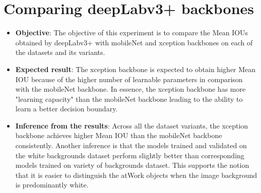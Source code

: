 \section{Comparing deepLabv3+ backbones}

	\begin{itemize}
		\item \textbf{Objective}: The objective of this experiment is to compare the Mean IOUs obtained by deepLabv3+ with mobileNet and xception backbones on each of the datasets and its variants.
		\item \textbf{Expected result}: The xception backbone is expected to obtain higher Mean IOU because of the higher number of learnable parameters in comparison with the mobileNet backbone. In essence, the xception backbone has more "learning capacity" than the mobileNet backbone leading to the ability to learn a better decision boundary.
		\item \textbf{Inference from the results}: Across all the dataset variants, the xception backbone achieves higher Mean IOU than the mobileNet backbone consistently. Another inference is that the models trained and validated on the white backgrounds dataset perform slightly better than corresponding models trained on variety of backgrounds dataset. This supports the notion that it is easier to distinguish the atWork objects when the image background is predominantly white.
	\end{itemize}

